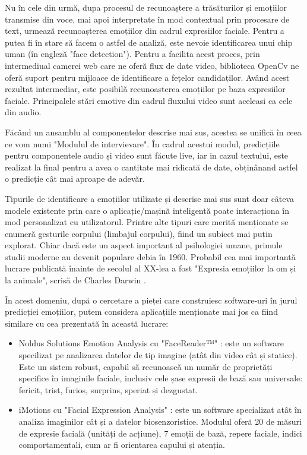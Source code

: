 \documentclass[a4paper, 12pt]{report}
\begin{document}
	Nu în cele din urmă, dupa procesul de recunoaștere a trăsăturilor și emoțiilor transmise din voce, mai apoi interpretate în mod contextual prin procesare de text, urmează recunoașterea emoțiilor din cadrul expresiilor faciale. Pentru a putea fi în stare să facem o astfel de analiză, este nevoie identificarea unui chip uman (în engleză "face detection"). Pentru a facilita acest proces, prin intermediual camerei web care ne oferă flux de date video, biblioteca OpenCv\cite{open_cv} ne oferă suport pentru mijloace de identificare a fețelor candidaților. Având acest rezultat intermediar, este posibilă recunoașterea emoțiilor pe baza expresiilor faciale. Principalele stări emotive din cadrul fluxului video sunt aceleasi ca cele din audio.
	
	Făcând un ansamblu al componentelor descrise mai sus, acestea se unifică în ceea ce vom numi "Modulul de intervievare". În cadrul acestui modul, predicțiile pentru componentele audio și video sunt făcute live, iar in cazul textului, este realizat la final pentru a avea o cantitate mai ridicată de date, obținânand astfel o predicție cât mai aproape de adevăr.
	
	Tipurile de identificare a emoțiilor utilizate și descrise mai sus sunt doar câteva modele existente prin care o aplicație/mașină inteligentă poate interacționa în mod personalizat cu utilizatorul. Printre alte tipuri care merită menționate se enumeră gesturile corpului (limbajul corpului), fiind un subiect mai puțin explorat. Chiar dacă este un aspect important al psihologiei umane, primule studii moderne au devenit populare debia în 1960. Probabil cea mai importantă lucrare publicată înainte de secolul al XX-lea a fost "Expresia emoțiilor la om și la animale", scrisă de Charles Darwin \cite{human_body_lang_darwin}.
	
	În acest domeniu, după o cercetare a pieței care construiesc software-uri în jurul predicției emoțiilor, putem considera aplicațiile menționate mai jos ca fiind similare cu cea prezentată în această lucrare:
	\begin{itemize}
		\item Noldus Solutions Emotion Analysis cu "FaceReader™" \cite{noldus}: este un software specilizat pe analizarea datelor de tip imagine (atât din video cât și statice). Este un sistem robust, capabil să recunoască un număr de proprietăți specifice în imaginile faciale, inclusiv cele șase expresii de bază sau universale: fericit, trist, furios, surprins, speriat și dezgustat.
		\item iMotions cu "Facial Expression Analysis" \cite{imotions}: este un software specializat atât în analiza imaginilor cât și a datelor biosenzoristice. Modulul oferă 20 de măsuri de expresie facială (unități de acțiune), 7 emoții de bază, repere faciale, indici comportamentali, cum ar fi orientarea capului și atenția.
	\end{itemize}
	
\end{document}
